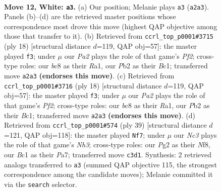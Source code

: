 \documentclass[11pt]{article}
\begin{document}
\clearpage

\begin{figure}[p]\centering
\begin{subfigure}{0.46\textwidth}\centering
\resizebox{\linewidth}{!}{%
\newchessgame
\chessboard[
  setfen={rnbr2k1/p4pb1/2p2np1/1p2N2p/4P3/2N5/PPP1BPPP/R1B1RK2 w - - 0 12},
  showmover=false,
  pgfstyle=straightmove, color=movearrow, markmove={a2-a3}
]}
\caption{}
\end{subfigure}\hfill
\begin{subfigure}{0.46\textwidth}\centering
\resizebox{\linewidth}{!}{%
\newchessgame
\chessboard[
  setfen={rnb1kb1r/p4ppp/2p2n2/8/PppNP3/8/1P3PPP/R1BNKB1R w KQkq - 2 10},
  showmover=false,
  pgfstyle=straightmove, color=movearrow, markmove={f2-f3}
]}
\caption{}
\end{subfigure}
\\[4pt]
\begin{subfigure}{0.46\textwidth}\centering
\resizebox{\linewidth}{!}{%
\newchessgame
\chessboard[
  setfen={rnb1kb1r/p4ppp/2p2n2/8/PppNP3/8/1P3PPP/R1BNKB1R w KQkq - 2 10},
  showmover=false,
  pgfstyle=straightmove, color=movearrow, markmove={f2-f3}
]}
\caption{}
\end{subfigure}\hfill
\begin{subfigure}{0.46\textwidth}\centering
\resizebox{\linewidth}{!}{%
\newchessgame
\chessboard[
  setfen={3r1n2/ppkbr1pp/2p2p1n/P6N/3NP1P1/3R3P/BPP5/2K4R b - - 2 20},
  showmover=false,
  pgfstyle=straightmove, color=movearrow, markmove={h6-f7}
]}
\caption{}
\end{subfigure}
\caption{\textbf{Move 12, White: \texttt{a3}.} (a) Our position; Melanie plays \texttt{a3} (\texttt{a2a3}). Panels (b)--(d) are the retrieved master positions whose correspondence most drove this move (highest QAP objective among those that transfer to it). (b) Retrieved from \texttt{ccrl\_top\_p0001\#3715} (ply 18) [structural distance $d$=119, QAP obj=57]: the master played \texttt{f3}; under $\mu$ our \emph{Pa2} plays the role of that game's \emph{Pf2}; cross-type roles: our \emph{b}c8 as their \emph{R}a1, our \emph{P}b2 as their \emph{B}c1; transferred move \texttt{a2a3} \textbf{(endorses this move)}. (c) Retrieved from \texttt{ccrl\_top\_p0001\#3716} (ply 18) [structural distance $d$=119, QAP obj=57]: the master played \texttt{f3}; under $\mu$ our \emph{Pa2} plays the role of that game's \emph{Pf2}; cross-type roles: our \emph{b}c8 as their \emph{R}a1, our \emph{P}b2 as their \emph{B}c1; transferred move \texttt{a2a3} \textbf{(endorses this move)}. (d) Retrieved from \texttt{ccrl\_top\_p0001\#574} (ply 39) [structural distance $d$=121, QAP obj=118]: the master played \texttt{Nf7}; under $\mu$ our \emph{Nc3} plays the role of that game's \emph{Nh3}; cross-type roles: our \emph{P}g2 as their \emph{N}f8, our \emph{B}c1 as their \emph{P}a7; transferred move \texttt{c3d1}. Synthesis: 2 retrieved analogs transferred to \texttt{a3} (summed QAP objective 115, the strongest correspondence among the candidate moves); Melanie committed it via the \texttt{search} selector.}
\label{fig:thought-m22}
\end{figure}
\end{document}
